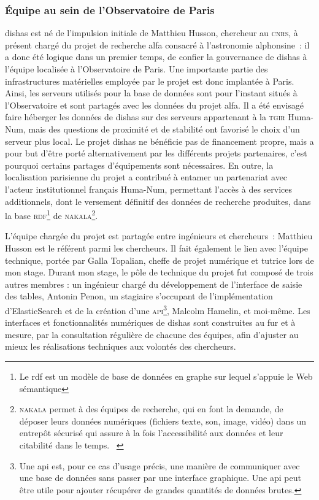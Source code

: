 \documentclass[a4paper,12pt,twoside]{book}
\newcommand{\g}[1]{\og#1~\fg}
\newcommand{\dishas}{\gls{dishas}\xspace}
\newcommand{\alfa}{\gls{alfa}\xspace}
\newcommand{\rdf}{\gls{rdf}\xspace}
\newcommand{\api}{\gls{api}\xspace}
\begin{document}
			\subsubsection{Équipe au sein de l'Observatoire de Paris}
\dishas est né de l'impulsion initiale de Matthieu Husson, chercheur au \textsc{cnrs}, à présent chargé du projet de recherche \alfa consacré à l'astronomie alphonsine~: il a donc été logique dans un premier temps, de confier la gouvernance de \dishas à l'équipe localisée à l'Observatoire de Paris. Une importante partie des infrastructures matérielles employée par le projet est donc implantée à Paris. Ainsi, les serveurs utilisés pour la base de données sont pour l'instant situés à l'Observatoire et sont partagés avec les données du projet \alfa. Il a été envisagé faire héberger les données de \dishas sur des serveurs appartenant à la \textsc{tgir} Huma-Num, mais des questions de proximité et de stabilité ont favorisé le choix d'un serveur plus local. Le projet \dishas ne bénéficie pas de financement propre, mais a pour but d'être porté alternativement par les différents projets partenaires, c'est pourquoi certains partages d'équipements sont nécessaires. En outre, la localisation parisienne du projet a contribué à entamer un partenariat avec l'acteur institutionnel français Huma-Num, permettant l'accès à des services additionnels, dont le versement définitif des données de recherche produites, dans la base \textsc{rdf}\footnote{Le \rdf est un modèle de base de données en graphe sur lequel s'appuie le Web sémantique} de \textsc{nakala}\footnote{\g{\textsc{nakala} permet à des équipes de recherche, qui en font la demande, de déposer leurs données numériques (fichiers texte, son, image, vidéo) dans un entrepôt sécurisé qui assure à la fois l'accessibilité aux données et leur citabilité dans le temps.} \cite{NAKALAParHumaNuma}}.

L'équipe chargée du projet est partagée entre ingénieurs et chercheurs~: Matthieu Husson est le référent parmi les chercheurs. Il fait également le lien avec l'équipe technique, portée par Galla Topalian, cheffe de projet numérique et tutrice lors de mon stage. Durant mon stage, le pôle de technique du projet fut composé de trois autres membres : un ingénieur chargé du développement de l'interface de saisie des tables, Antonin Penon, un stagiaire s'occupant de l'implémentation d'ElasticSearch et de la création d'une \textsc{api}\footnote{Une \api est, pour ce cas d'usage précis, une manière de communiquer avec une base de données sans passer par une interface graphique. Une \api peut être utile pour ajouter récupérer de grandes quantités de données brutes.}, Malcolm Hamelin, et moi-même. Les interfaces et fonctionnalités numériques de \dishas sont construites au fur et à mesure, par la consultation régulière de chacune des équipes, afin d'ajuster au mieux les réalisations techniques aux volontés des chercheurs.
\end{document}
